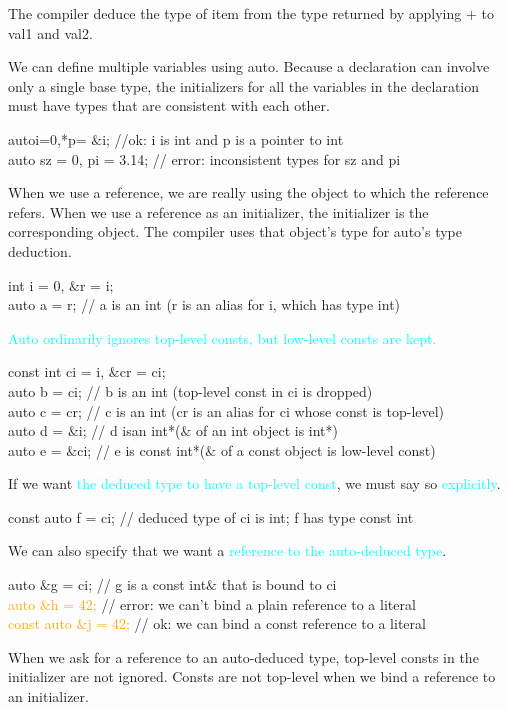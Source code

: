 \documentclass[12pt,a4paper]{article}
\begin{document}
The compiler deduce the type of item from the type returned by applying + to val1 and val2.

We can define multiple variables using auto. Because a declaration can involve only a single base type, the initializers for all the variables in the declaration must have types that are consistent with each other.

autoi=0,*p= $\&$i; //ok: i is int and p is a pointer to int \\
auto sz = 0, pi = 3.14; // error: inconsistent types for sz and pi

When we use a reference, we are really using the object to which the reference refers. When we use a reference as an initializer, the initializer is the corresponding object. The compiler uses that object’s type for auto’s type deduction.

int i = 0, $\&$r = i; \\
auto a = r; // a is an int (r is an alias for i, which has type int)

\textcolor{cyan}{Auto ordinarily ignores top-level consts, but low-level consts are kept.}

const int ci = i, $\&$cr = ci; \\
auto b = ci; // b is an int (top-level const in ci is dropped) \\
auto c = cr; // c is an int (cr is an alias for ci whose const is top-level) \\
auto d = $\&$i; // d isan int*($\&$ of an int object is int*) \\
auto e = $\&$ci; // e is const int*($\&$ of a const object is low-level const)

If we want \textcolor{cyan}{the deduced type to have a top-level const}, we must say so \textcolor{cyan}{explicitly}.

const auto f = ci; // deduced type of ci is int; f has type const int

We can also specify that we want a \textcolor{cyan}{reference to the auto-deduced type}.

auto $\&$g = ci; // g is a const int$\&$ that is bound to ci \\
\textcolor{orange}{auto $\&$h = 42;} // error: we can't bind a plain reference to a literal \\
\textcolor{orange}{const auto $\&$j = 42;} // ok: we can bind a const reference to a literal

When we ask for a reference to an auto-deduced type, top-level consts in the initializer are not ignored. Consts are not top-level when we bind a reference to an initializer.
\end{document}
